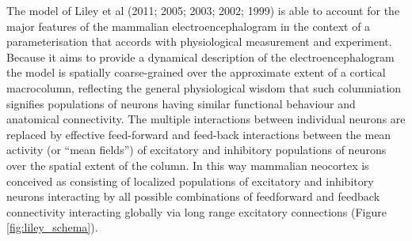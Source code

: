 \documentclass[a4paper,12pt]{article}
\begin{document}
The model of Liley et al (2011; 2005; 2003; 2002; 1999) is able to
account for the major features of the mammalian
electroencephalogram in the context of a parameterisation that
accords with physiological measurement and experiment. Because it
aims to provide a dynamical description of the electroencephalogram
the model is spatially coarse-grained over the approximate extent of a
cortical macrocolumn, reflecting the general physiological wisdom that
such columniation signifies populations of neurons having similar
functional behaviour and anatomical connectivity. The multiple
interactions between individual neurons are replaced by effective feed-forward
and feed-back interactions between the mean activity (or
“mean fields”) of excitatory and inhibitory populations of neurons over
the spatial extent of the column. In this way mammalian neocortex is
conceived as consisting of localized populations of excitatory and
inhibitory neurons interacting by all possible combinations of
feedforward and feedback connectivity interacting globally via long
range excitatory connections (Figure \ref{fig:liley_schema}).
\end{document}
